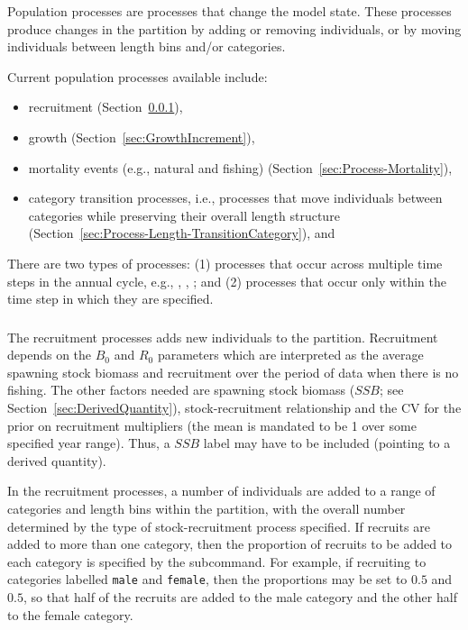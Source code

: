 
Population processes are processes that change the model state. These processes produce changes in the partition by adding or removing individuals, or by moving individuals between length bins and/or categories.

Current population processes available include:

\begin{itemize}
\item recruitment (Section~\ref{sec:Process-Length-Recruitment}),
\item growth (Section~\ref{sec:GrowthIncrement}),
\item mortality events (e.g., natural and fishing) (Section~\ref{sec:Process-Mortality}), 
\item category transition processes, i.e., processes that move individuals between categories while preserving their overall length structure (Section~\ref{sec:Process-Length-TransitionCategory}), and
\end{itemize}

There are two types of processes: (1) processes that occur across multiple time steps in the annual cycle, e.g., , , ; and (2) processes that occur only within the time step in which they are specified.

\subsubsection{}\label{sec:Process-Length-Recruitment}

The recruitment processes adds new individuals to the partition. Recruitment depends on the \(B_{0}\) and \(R_{0}\) parameters which are interpreted as the average spawning stock biomass and recruitment over the period of data when there is no fishing. The other factors needed are spawning stock biomass ($SSB$; see Section~\ref{sec:DerivedQuantity}), stock-recruitment relationship and the CV for the prior on recruitment multipliers (the mean is mandated to be 1 over some specified year range). Thus, a $SSB$ label may have to be included (pointing to a derived quantity).

In the recruitment processes, a number of individuals are added to a range of categories and length bins within the partition, with the overall number determined by the type of stock-recruitment process specified. If recruits are added to more than one category, then the proportion of recruits to be added to each category is specified by the  subcommand. For example, if recruiting to categories labelled \texttt{male} and \texttt{female}, then the proportions may be set to $0.5$ and $0.5$, so that half of the recruits are added to the male category and the other half to the female category.

